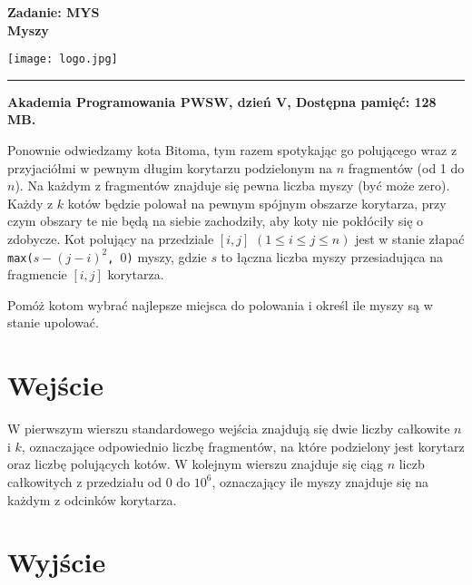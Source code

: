 \documentclass[10pt]{article}
\begin{document}
    

    \noindent
    \begin{minipage}{0.5\textwidth}
        \LARGE{\textsf{\textbf{Zadanie: MYS\\Myszy}}}
    \end{minipage}
    \begin{minipage}{0.5\textwidth}
        \begin{flushright}
            \texttt{[image: logo.jpg]}
        \end{flushright}
    \end{minipage}
    
    \noindent\rule{\textwidth}{0.4pt}
    
    \noindent\textbf{Akademia Programowania PWSW, dzień V, Dostępna pamięć: 128 MB.}
    \vspace{1em}
    
    
    \noindent
    Ponownie odwiedzamy kota Bitoma, tym razem spotykając go polującego wraz z przyjaciółmi w pewnym długim korytarzu podzielonym na $n$ fragmentów (od 1 do $n$). Na każdym z fragmentów znajduje się pewna liczba myszy (być może zero). Każdy z $k$ kotów będzie polował na pewnym spójnym obszarze korytarza, przy czym obszary te nie będą na siebie zachodziły, aby koty nie pokłóciły się o zdobycze. Kot polujący na przedziale $[i, j]$ $(1\leq i\leq j\leq n)$ jest w stanie złapać \texttt{max($s - (j - i)^{2}$, $0$)} myszy, gdzie $s$ to łączna liczba myszy przesiadująca na fragmencie $[i, j]$ korytarza.
    
    Pomóż kotom wybrać najlepsze miejsca do polowania i określ ile myszy są w stanie upolować.
    


    \section*{Wejście}
    
    W pierwszym wierszu standardowego wejścia znajdują się dwie liczby całkowite $n$ i $k$, oznaczające odpowiednio liczbę fragmentów, na które podzielony jest korytarz oraz liczbę polujących kotów. W kolejnym wierszu znajduje się ciąg $n$ liczb całkowitych z przedziału od 0 do $10^{6}$, oznaczający ile myszy znajduje się na każdym z odcinków korytarza.


    \section*{Wyjście}
    
\end{document}
